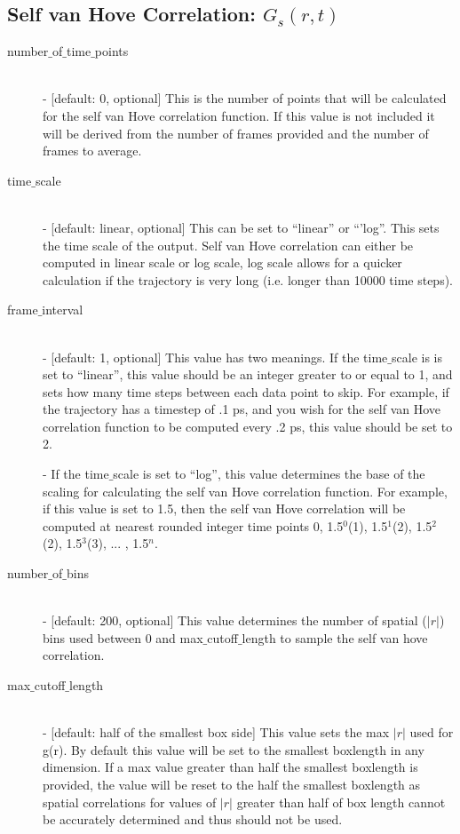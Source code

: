 \documentclass{article}
\begin{document}
\subsection{Self van Hove Correlation: $G_s(r,t)$} \label{sec::Gofrt_parm}
\begin{description}	
	\item[number$\_$of$\_$time$\_$points]\hfill \\
	- [default: 0, optional] This is the number of points that will be calculated for the self van Hove correlation function.  If this value is not included it will be derived from the number of frames provided and the number of frames to average.
	
	\item[time$\_$scale] \hfill \\
	- [default: linear, optional] This can be set to ``linear'' or ``'log''.  This sets the time scale of the output. Self van Hove correlation can either be computed in linear scale or log scale, log scale allows for a quicker calculation if the trajectory is very long (i.e. longer than 10000 time steps).
	
	\item[frame$\_$interval] \hfill \\
	- [default: 1, optional] This value has two meanings.  If the time$\_$scale is is set to ``linear'', this value should be an integer greater to or equal to 1, and sets how many time steps between each data point to skip.  For example, if the trajectory has a timestep of .1 ps, and you wish for the self van Hove correlation function to be computed every .2 ps, this value should be set to 2. 
	
	- If the time$\_$scale is set to ``log'', this value determines the base of the scaling for calculating the self van Hove correlation function.   For example, if this value is set to 1.5, then the self van Hove correlation will be computed at nearest rounded integer time points 0, 1.5$^0$(1), 1.5$^1$(2), 1.5$^2$(2), 1.5$^3$(3), ... , 1.5$^{n}$.
	
	\item[number$\_$of$\_$bins] \hfill \\
	- [default: 200, optional] This value determines the number of spatial ($|r|$) bins used between 0 and max$\_$cutoff$\_$length to sample the self van hove correlation.
	
	\item[max$\_$cutoff$\_$length] \hfill \\
	- [default: half of the smallest box side] This value sets the max $|r|$ used for g(r).  By default this value will be set to the smallest boxlength in any dimension.  If a max value greater than half the smallest boxlength is provided, the value will be reset to the half the smallest boxlength as spatial correlations for values of $|r|$ greater than half of box length cannot be accurately determined and thus should not be used.
\end{description}
\end{document}
